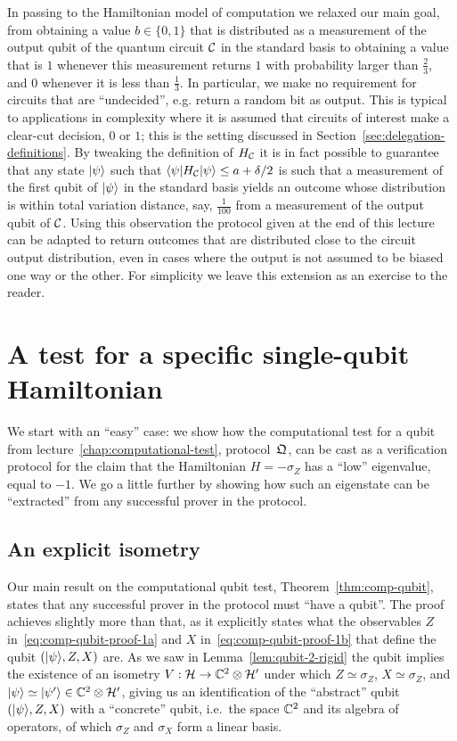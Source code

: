 \begin{remark}
In passing to the Hamiltonian model of computation we relaxed our main goal,  from obtaining a value $b \in \{0,1\}$ that is distributed as a measurement of the output qubit of the quantum circuit $\mathcal{C}$ in the standard basis to obtaining a value that is $1$ whenever this measurement returns $1$ with probability larger than $\frac{2}{3}$, and $0$ whenever it is less than $\frac{1}{3}$. In particular, we make no requirement for circuits that are ``undecided'', e.g. return a random bit as output. This is typical to applications in complexity where it is assumed that circuits of interest make a clear-cut decision, $0$ or $1$; this is the setting discussed in Section~\ref{sec:delegation-definitions}. By tweaking the definition of $H_{\mathcal{C}}$ it is in fact possible to guarantee that any state $|\psi\rangle$ such that $\langle\psi| H_{\mathcal{C}} |\psi\rangle \leq a + \delta/2$ is such that a measurement of the first qubit of $|\psi\rangle$ in the standard basis yields an outcome whose distribution is within total variation distance, say, $\frac{1}{100}$ from a measurement of the output qubit of $\mathcal{C}$. Using this observation the protocol given at the end of this lecture can be adapted to return outcomes that are distributed close to the circuit output distribution, even in cases where the output is not assumed to be biased one way or the other. For simplicity we leave this extension as an exercise to the reader. 
\end{remark}


\section{A test for a specific single-qubit Hamiltonian}

We start with an ``easy'' case: we show how the computational test for a qubit from lecture~\ref{chap:computational-test}, protocol~$\mathfrak{Q}$, can be cast as a verification protocol for the claim that the Hamiltonian $H=-\sigma_Z$ has a ``low'' eigenvalue, equal to $-1$. We go a little further by showing how such an eigenstate can be ``extracted'' from any successful prover in the protocol. 

\subsection{An explicit isometry}
\label{sec:explicit-iso}

Our main result on the computational qubit test, Theorem~\ref{thm:comp-qubit}, states that any successful prover in the protocol must ``have a qubit''. The proof achieves slightly more than that, as it explicitly states what the observables $Z$ in~\eqref{eq:comp-qubit-proof-1a} and $X$ in~\eqref{eq:comp-qubit-proof-1b}  that define the qubit $(|\psi\rangle,Z,X)$ are. As we saw in Lemma~\ref{lem:qubit-2-rigid} the qubit implies the existence of an isometry $V:\mathcal{H}\to \mathbb{C}^2\otimes \mathcal{H}'$ under which $Z\simeq \sigma_Z$, $X\simeq \sigma_Z$, and $|\psi\rangle\simeq |\psi'\rangle \in \mathbb{C}^2 \otimes \mathcal{H}'$, giving us an identification of the ``abstract'' qubit $(|\psi\rangle,Z,X)$ with a ``concrete'' qubit, i.e.\ the space $\mathbb{C}^2$ and its algebra of operators, of which $\sigma_Z$ and $\sigma_X$ form a linear basis. 

